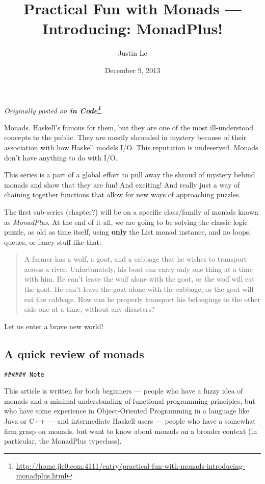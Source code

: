\documentclass[]{article}
\title{Practical Fun with Monads --- Introducing: MonadPlus!}
\author{Justin Le}
\date{December 9, 2013}
\renewcommand{\href}[2]{#2\footnote{\url{#1}}}
\begin{document}
\maketitle

\emph{Originally posted on
\textbf{\href{http://home.jle0.com:4111/entry/practical-fun-with-monads-introducing-monadplus.html}{in
Code}}.}

Monads. Haskell's famous for them, but they are one of the most ill-understood concepts to the
public. They are mostly shrouded in mystery because of their association with how Haskell models
I/O. This reputation is undeserved. Monads don't have anything to do with I/O.

This series is a part of a global effort to pull away the shroud of mystery behind monads and show
that they are fun! And exciting! And really just a way of chaining together functions that allow for
new ways of approaching puzzles.

The first sub-series (chapter?) will be on a specific class/family of monads known as
\emph{MonadPlus}. At the end of it all, we are going to be solving the classic logic puzzle, as old
as time itself, using \textbf{only} the List monad instance, and no loops, queues, or fancy stuff
like that:

\begin{quote}
A farmer has a wolf, a goat, and a cabbage that he wishes to transport across a river.
Unfortunately, his boat can carry only one thing at a time with him. He can't leave the wolf alone
with the goat, or the wolf will eat the goat. He can't leave the goat alone with the cabbage, or the
goat will eat the cabbage. How can he properly transport his belongings to the other side one at a
time, without any disasters?
\end{quote}

Let us enter a brave new world!

\subsection{A quick review of monads}\label{a-quick-review-of-monads}

\begin{verbatim}
###### Note
\end{verbatim}

This article is written for both beginners --- people who have a fuzzy idea of monads and a minimal
understanding of functional programming principles, but who have some experience in Object-Oriented
Programming in a language like Java or C++ --- and intermediate Haskell users --- people who have a
somewhat firm grasp on monads, but want to know about monads on a broader context (in particular,
the MonadPlus typeclass).
\end{document}
